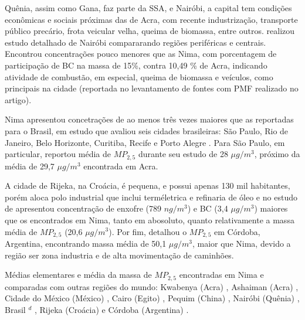 Quênia, assim como Gana, faz parte da SSA, e Nairóbi, a capital tem condições
econômicas e sociais próximas das de Acra, com recente industrização, transporte
público precário, frota veicular velha, queima de biomassa, entre outros.  
\citet{gaita2014} realizou estudo detalhado de Nairóbi compararando regiões 
periféricas e centrais. Encontrou concentrações pouco menores que as Nima, 
com porcentagem de participação de BC na massa de 15\%, contra 10,49 \% de Acra,
indicando atividade de combustão, em especial, queima de biomassa e veículos, 
como principais na cidade (reportada no levantamento de fontes com PMF realizado
no artigo). 

Nima apresentou concetrações de ao menos três vezes maiores que as reportadas 
para o Brasil, em estudo que avaliou seis cidades brasileiras: São Paulo, 
Rio de Janeiro, Belo Horizonte, Curitiba, Recife e Porto Alegre
\citep{andrade2012urban}. Para São Paulo, em particular, \citet{andrade2012}
reportou média de $MP_{2,5}$ durante seu estudo de 28 $\mu g / m^3$, 
próximo da média de 29,7 $\mu g / m^3$ encontrada em Acra. 

A cidade de Rijeka, na Croácia, é pequena, e possui apenas 130 mil habitantes, 
porém aloca polo industrial que inclui terméletrica e refinaria de óleo
e no estudo de \citep{ivovsevic2015} apresentou concentração de enxofre
(789 $ng / m^3$) e BC (3,4 $\mu g / m^3$) maiores que os encontrados em Nima, 
tanto em abosoluto, quanto relativamente a massa média de $MP_{2,5}$ 
(20,6 $\mu g / m^3$). 
Por fim, \citet{achad2014} detalhou o $MP_{2,5}$ em Córdoba, Argentina, 
encontrando massa média de 50,1 $\mu g / m^3$, maior que Nima, devido a região
ser zona industria e de alta movimentação de caminhões.   

\begin{landscape}
  \begin{table}[H]
    \centering
    
    \caption{Médias elementares e média da massa de $MP_{2,5}$ encontradas
             em Nima e comparadas com outras regiões do mundo:
             Kwabenya (Acra) \citep{aboh2009},
             Ashaiman (Acra) \citep{ofosu2012},
             Cidade do México (México) \citep{diaz2014},
             Cairo (Egito) \citep{boman2013},
             Pequim (China) \citep{yang2011},
             Nairóbi (Quênia)  \citep{gaita2014},
             Brasil $^d$ \citep{andrade2012urban},
             Rijeka (Croácia) \citep{ivovsevic2015} e
             Córdoba (Argentina) \citep{achad2014}.
             \label{table:fino_in_the_world}}
  \end{table} 
\end{landscape}

